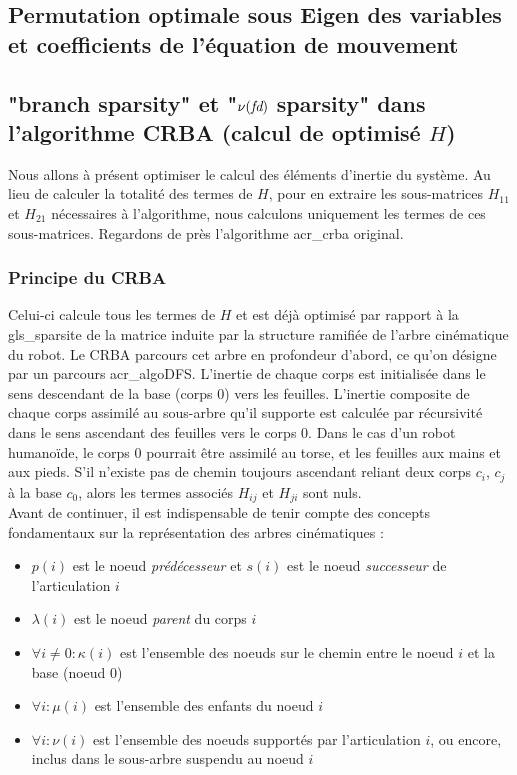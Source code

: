 \documentclass{report}
\begin{document}
\subsection{Permutation optimale sous Eigen des variables et coefficients de l'équation de mouvement}


\subsection{"branch sparsity" et "$\nu(\emph{fd})$ sparsity" dans l'algorithme CRBA (calcul de optimisé $H$)}

Nous allons à présent optimiser le calcul des éléments d'inertie du système. Au lieu de calculer la totalité des termes de $H$, pour en extraire les sous-matrices $H_{11}$ et $H_{21}$ nécessaires à l'algorithme, nous calculons uniquement les termes de ces sous-matrices. Regardons de près l'algorithme \gls{acr_crba} original.\\

\subsubsection{Principe du CRBA}
Celui-ci calcule tous les termes de $H$ et est déjà optimisé par rapport à la \gls{gls_sparsite} de la matrice induite par la structure ramifiée de l'arbre cinématique du robot. Le CRBA parcours cet arbre en profondeur d'abord, ce qu'on désigne par un parcours \gls{acr_algoDFS}. L'inertie de chaque corps est initialisée dans le sens descendant de la base (corps 0) vers les feuilles. L'inertie composite de chaque corps assimilé au sous-arbre qu'il supporte est calculée par récursivité dans le sens ascendant des feuilles vers le corps 0. Dans le cas d'un robot humanoïde, le corps 0 pourrait être assimilé au torse, et les feuilles aux mains et aux pieds. S'il n'existe pas de chemin toujours ascendant reliant deux corps $c_i$, $c_j$ à la base $c_0$, alors les termes associés $H_{ij}$ et $H_{ji}$ sont nuls.\\
Avant de continuer, il est indispensable de tenir compte des concepts fondamentaux sur la représentation des arbres cinématiques \cite{ch_algSpa_equationMouvement}:

\begin{itemize}
\item $p(i)$ est le noeud \emph{prédécesseur} et $s(i)$ est le noeud \emph{successeur} de l'articulation $i$
\item $\lambda(i)$ est le noeud \emph{parent} du corps $i$
\item $\forall i \neq 0: \kappa(i)$ est l'ensemble des noeuds sur le chemin entre le noeud $i$ et la base (noeud $0$)
\item $\forall i: \mu (i)$  est l'ensemble des enfants du noeud $i$
\item $\forall i: \nu (i)$  est l'ensemble des noeuds supportés par l'articulation $i$, ou encore, inclus dans le sous-arbre suspendu au noeud $i$
\end{itemize}
\end{document}
